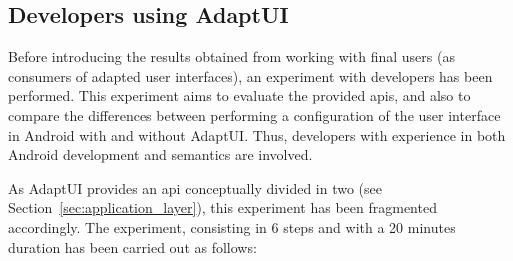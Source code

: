 \subsection{Developers using AdaptUI}
\label{sec:developers}

Before introducing the results obtained from working with final users (as 
consumers of adapted user interfaces), an experiment with developers has been 
performed. This experiment aims to evaluate the provided \acp{api}, and also to 
compare the differences between performing a configuration of the user interface 
in Android with and without AdaptUI. Thus, developers with experience in both 
Android development and semantics are involved.

As AdaptUI provides an \ac{api} conceptually divided in two (see 
Section~\ref{sec:application_layer}), this experiment has been fragmented 
accordingly. The experiment, consisting in 6 steps and with a 20 minutes duration
has been carried out as follows:

